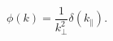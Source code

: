\begin{equation}
\phi (k) = \frac{1}{k_\bot^2}  \delta (k_\parallel).
\label{eq:linearized-momentum}
\end{equation}

